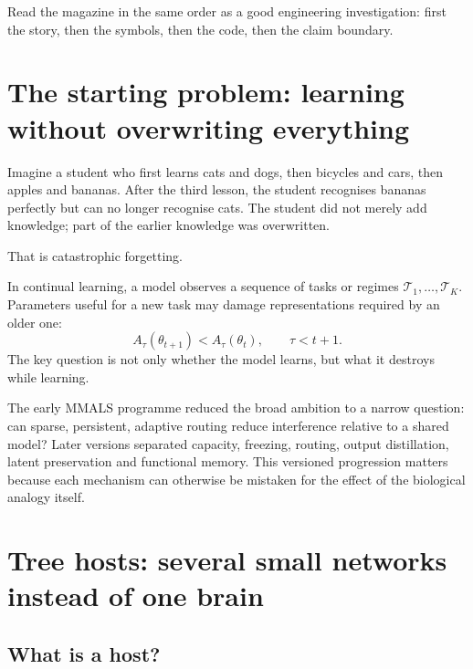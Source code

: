 \documentclass[11pt,a4paper]{article}
\begin{document}
\begin{keybox}
Read the magazine in the same order as a good engineering investigation: first the story, then the symbols, then the code, then the claim boundary.
\end{keybox}

\newpage
\section{The starting problem: learning without overwriting everything}

\begin{twelvebox}
Imagine a student who first learns cats and dogs, then bicycles and cars, then apples and bananas. After the third lesson, the student recognises bananas perfectly but can no longer recognise cats. The student did not merely add knowledge; part of the earlier knowledge was overwritten.

That is catastrophic forgetting.
\end{twelvebox}

\begin{engineerbox}
In continual learning, a model observes a sequence of tasks or regimes $\mathcal{T}_1,\ldots,\mathcal{T}_K$. Parameters useful for a new task may damage representations required by an older one:
\[
A_{\tau}(\theta_{t+1}) < A_{\tau}(\theta_t), \qquad \tau<t+1.
\]
The key question is not only whether the model learns, but what it destroys while learning.
\end{engineerbox}

\begin{researchbox}
The early MMALS programme reduced the broad ambition to a narrow question: can sparse, persistent, adaptive routing reduce interference relative to a shared model? Later versions separated capacity, freezing, routing, output distillation, latent preservation and functional memory. This versioned progression matters because each mechanism can otherwise be mistaken for the effect of the biological analogy itself.
\end{researchbox}

\section{Tree hosts: several small networks instead of one brain}

\subsection{What is a host?}
\end{document}
